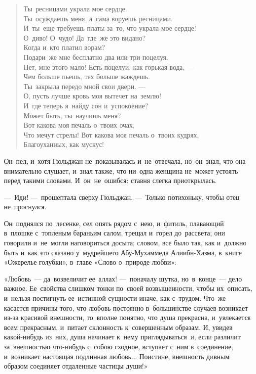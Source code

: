 \documentclass[12pt,a4paper]{book}
\begin{document}
\begin{verse}
Ты~ресницами украла мое сердце. \\
Ты~осуждаешь меня, а~сама воруешь ресницами. \\
И~ты~еще требуешь платы за~то, что украла мое сердце! \\
О~диво! О~чудо! Да~где~же это видано? \\
Когда и~кто платил ворам? \\
Подари~же мне бесплатно два или три поцелуя. \\
Нет, мне этого мало! Есть поцелуи, как горькая вода, --- \\
Чем больше пьешь, тех больше жаждешь. \\
Ты~закрыла передо мной свои двери. --- \\
О, пусть лучше кровь моя вытечет на~землю! \\
И~где теперь я~найду сон и~успокоение? \\
Может быть, ты~научишь меня? \\
Вот какова моя печаль о~твоих очах, \\
Что мечут стрелы! Вот какова моя печаль о~твоих кудрях, \\
Благоуханных, как мускус!
\end{verse}

Он~пел, и~хотя Гюльджан не~показывалась и~не~отвечала, но~он~знал, что она внимательно слушает, и~знал также, что ни~одна женщина не~может устоять перед такими словами. И~он~не~ошибся: ставня слегка приоткрылась.

—~Иди! —~прошептала сверху Гюльджан. —~Только потихоньку, чтобы отец не~проснулся.

Он~поднялся по~лесенке, сел опять рядом с~нею, и~фитиль, плавающий в~плошке с~топленым бараньим салом, трещал и~горел до~рассвета; они говорили и~не~могли наговориться досыта; словом, все было так, как и~должно быть и~как это сказано у~мудрейшего Абу-Мухаммеда Алиибн-Хазма, в~книге «Ожерелье голубки», в~главе «Слово о~природе любви»:

«Любовь~— да~возвеличит ее~аллах! —~поначалу шутка, но~в~конце~— дело важное. Ее~свойства слишком тонки по~своей возвышенности, чтобы их~описать, и~нельзя постигнуть ее~истинной сущности иначе, как с~трудом. Что~же касается причины того, что любовь постоянно в~большинстве случаев возникает из-за красивой внешности, то~вполне понятно, что душа прекрасна, и~увлекается всем прекрасным, и~питает склонность к~совершенным образам. И, увидев какой-нибудь из~них, душа начинает к~нему приглядываться~и, если различит за~внешностью что-нибудь с~собою сходное, вступает с~ним в~соединение, и~возникает настоящая подлинная любовь... Поистине, внешность дивным образом соединяет отдаленные частицы души!»
\end{document}
